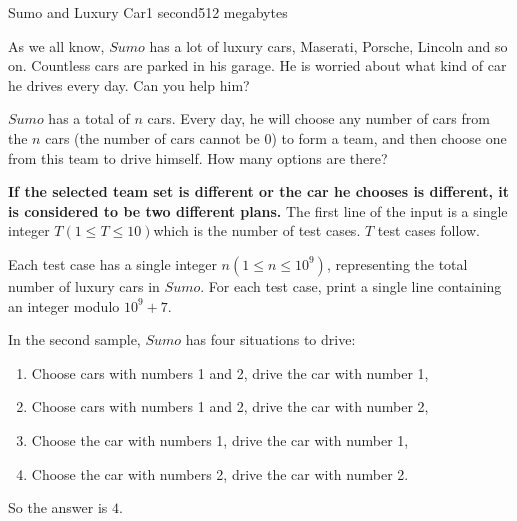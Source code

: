 \documentclass[11pt,a4paper,oneside]{article}
\begin{document}
\begin{problem}{Sumo and Luxury Car}{}{}{1 second}{512 megabytes}
	
	As we all know, $Sumo$ has a lot of luxury cars, Maserati, Porsche, Lincoln and so on. Countless cars are parked in his garage. He is worried about what kind of car he drives every day. Can you help him?
	
	$Sumo$ has a total of $n$ cars. Every day, he will choose any number of cars from the $n$ cars (the number of cars cannot be $0$) to form a team, and then choose one from this team to drive himself. How many options are there?
	
	\textbf{If the selected team set is different or the car he chooses is different, it is considered to be two different plans.}
	\InputFile
	The first line of the input is a single integer  $T(1 \leq T \leq 10)$which is the number of test cases. $T$ test cases follow.
	
	Each test case has  a single integer $n(1 \leq n \leq 10^9)$, representing the total number of luxury cars in $Sumo$.
	\OutputFile
	For each test case, print a single line containing an integer modulo $10^9+7$.
	\Examples
	\begin{example}
	\end{example}
	\Explanation
	In the second sample, $Sumo$ has four situations to drive:
	\begin{enumerate}
		\item Choose cars with numbers 1 and 2, drive the car with number 1,
		\item Choose cars with numbers 1 and 2, drive the car with number 2,
		\item Choose the car with numbers 1, drive the car with number 1,
		\item Choose the car with numbers 2, drive the car with number 2.
	\end{enumerate}
	So the answer is $4$.
	
	
	
\end{problem}
\end{document}
